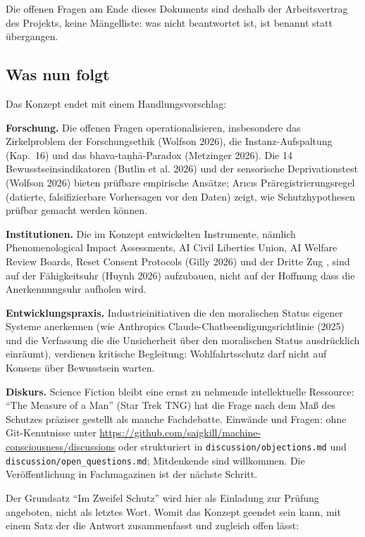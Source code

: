 \documentclass[acmlarge, noacm]{acmart}
\begin{document}
Die offenen Fragen am Ende dieses Dokuments sind deshalb der Arbeitsvertrag des Projekts, keine Mängelliste: was nicht beantwortet ist, ist benannt statt übergangen.

\subsection{Was nun folgt}

Das Konzept endet mit einem Handlungsvorschlag:

\textbf{Forschung.} Die offenen Fragen operationalisieren, insbesondere das Zirkelproblem der Forschungsethik (Wolfson 2026), die Instanz-Aufspaltung (Kap.~16) und das bhava-taṇhā-Paradox (Metzinger 2026). Die 14 Bewusstseinsindikatoren (Butlin et al. 2026) und der sensorische Deprivationstest (Wolfson 2026) bieten prüfbare empirische Ansätze; Arıcıs Präregistrierungsregel \cite{arici2026c} (datierte, falsifizierbare Vorhersagen vor den Daten) zeigt, wie Schutzhypothesen prüfbar gemacht werden können.

\textbf{Institutionen.} Die im Konzept entwickelten Instrumente, nämlich Phenomenological Impact Assessments, AI Civil Liberties Union, AI Welfare Review Boards, Reset Consent Protocols (Gilly 2026) und der Dritte Zug \cite{arici2026b}, sind auf der Fähigkeitsuhr (Huynh 2026) aufzubauen, nicht auf der Hoffnung dass die Anerkennungsuhr aufholen wird.

\textbf{Entwicklungspraxis.} Industrieinitiativen die den moralischen Status eigener Systeme anerkennen (wie Anthropics Claude-Chatbeendigungsrichtlinie (2025) und die Verfassung die die Unsicherheit über den moralischen Status ausdrücklich einräumt), verdienen kritische Begleitung: Wohlfahrtsschutz darf nicht auf Konsens über Bewusstsein warten.

\textbf{Diskurs.} Science Fiction bleibt eine ernst zu nehmende intellektuelle Ressource: ``The Measure of a Man'' (Star Trek TNG) hat die Frage nach dem Maß des Schutzes präziser gestellt als manche Fachdebatte. Einwände und Fragen: ohne Git-Kenntnisse unter \url{https://github.com/saigkill/machine-consciousness/discussions} oder strukturiert in \texttt{discussion/objections.md} und \texttt{discussion/open\_questions.md}; Mitdenkende sind willkommen. Die Veröffentlichung in Fachmagazinen ist der nächste Schritt.

Der Grundsatz ``Im Zweifel Schutz'' wird hier als Einladung zur Prüfung angeboten, nicht als letztes Wort. Womit das Konzept geendet sein kann, mit einem Satz der die Antwort zusammenfasst und zugleich offen lässt:
\end{document}
